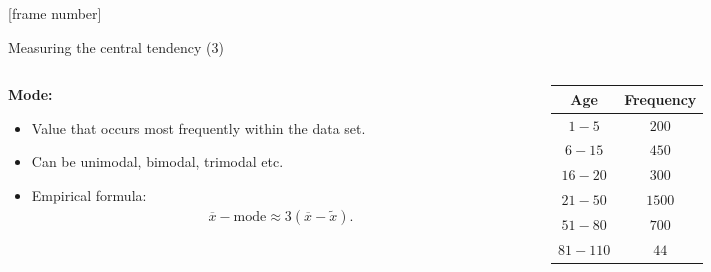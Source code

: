 \documentclass[aspectratio=169,t]{beamer}
\begin{document}
  {
    [frame number]
    \begin{frame}{Measuring the central tendency (3)}
      \begin{columns}
        \begin{column}{0.6\textwidth}
          \textbf{Mode:}
          \begin{itemize}[noitemsep]
            \item Value that occurs most frequently within the data set.
            \item Can be unimodal, bimodal, trimodal etc.
            \item Empirical formula:
            \begin{align}
              \overline{x} - \text{mode} \approx 3(\overline{x}- \tilde{x}).
            \end{align}
          \end{itemize}
        \end{column}
        \begin{column}{0.3\textwidth}  %
        \begin{table}
        \begin{tabular}{|c|c|}
          Age & Frequency \\ \hline
          $1-5$ & $200$ \\
          $6-15$ & $450$ \\
          $16-20$ & $300$ \\
          $21-50$ & $1500$ \\
          $51-80$ & $700$ \\
          $81-110$ & $44$
        \end{tabular}\\[0.5cm]
        \end{table}
        \end{column}
      \end{columns}
    \end{frame}
  }
\end{document}
